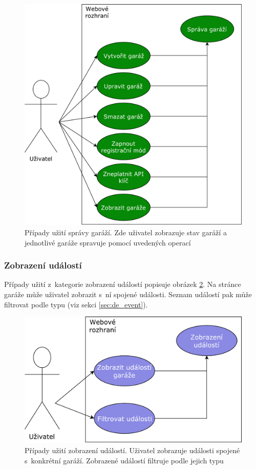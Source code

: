 \begin{figure}[h!]
    \centering
    \includegraphics[width=\textwidth]{images/use_case_garage.pdf}
    \caption[Případy užití správy garáží]{Případy užití správy garáží. Zde uživatel zobrazuje stav garáží a jednotlivé garáže spravuje pomocí uvedených operací}
    \label{fig:use_case_garage}
\end{figure}

\subsubsection{Zobrazení událostí}

Případy užití z~kategorie zobrazení událostí popisuje obrázek \ref{fig:use_case_events}. Na stránce garáže může uživatel zobrazit s~ní spojené události. Seznam událostí pak může filtrovat podle typu (viz sekci \ref{sec:de_event}).

\begin{figure}[h!]
    \centering
    \includegraphics[width=\textwidth]{images/use_case_events.pdf}
    \caption[Případy užití zobrazení událostí]{Případy užití zobrazení událostí. Uživatel zobrazuje události spojené s~konkrétní garáží. Zobrazené událostí filtruje podle jejich typu}
    \label{fig:use_case_events}
\end{figure}

